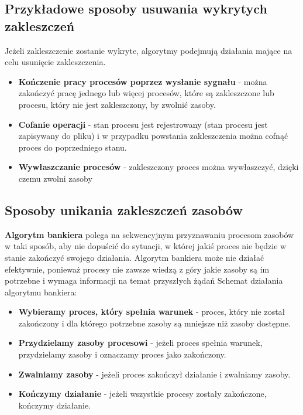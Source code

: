 \documentclass{article}
\begin{document}
\subsection*{Przykładowe sposoby usuwania wykrytych zakleszczeń}
Jeżeli zakleszczenie zostanie wykryte, algorytmy podejmują działania mające na celu usunięcie zakleszczenia.
\begin{itemize}
    \item \textbf{Kończenie pracy procesów poprzez wysłanie sygnału} - można zakończyć pracę jednego lub więcej procesów, które są zakleszczone lub procesu, który nie jest zakleszczony, by zwolnić zasoby.
    \item \textbf{Cofanie operacji} - stan procesu jest rejestrowany (stan procesu jest zapisywany do pliku) i w przypadku powstania zakleszczenia można cofnąć proces do poprzedniego stanu.
    \item \textbf{Wywłaszczanie procesów} - zakleszczony proces można wywłaszczyć, dzięki czemu zwolni zasoby
\end{itemize}

\subsection{Sposoby unikania zakleszczeń zasobów}
\textbf{Algorytm bankiera} polega na sekwencyjnym przyznawaniu procesom zasobów w taki sposób, aby nie dopuścić do sytuacji, w której jakiś proces nie będzie w stanie zakończyć swojego działania. Algorytm bankiera może nie działać efektywnie, ponieważ procesy nie zawsze wiedzą z góry jakie zasoby są im potrzebne i wymaga informacji na temat przyszłych żądań
Schemat działania algorytmu bankiera:
\begin{itemize}
    \item \textbf{Wybieramy proces, który spełnia warunek} - proces, który nie został zakończony i dla którego potrzebne zasoby są mniejsze niż zasoby dostępne.
    \item \textbf{Przydzielamy zasoby procesowi} - jeżeli proces spełnia warunek, przydzielamy zasoby i oznaczamy proces jako zakończony.
    \item \textbf{Zwalniamy zasoby} - jeżeli proces zakończył działanie i zwalniamy zasoby.
    \item \textbf{Kończymy działanie} - jeżeli wszystkie procesy zostały zakończone, kończymy działanie.
\end{itemize}
\end{document}

